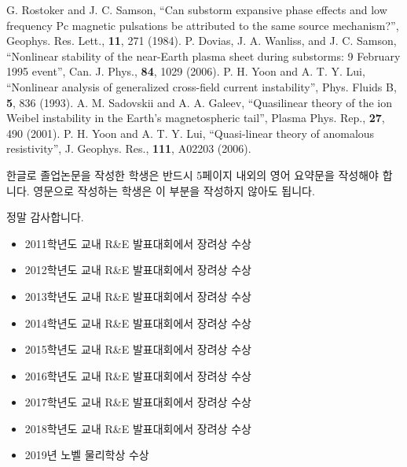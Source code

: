 \documentclass[twoside,11pt]{gshs_thesis}
\begin{document}
\begin{thebibliography}{99}
\begin{onehalfspace}
 G. Rostoker and J. C. Samson, ``Can substorm expansive phase effects and low frequency Pc magnetic pulsations be attributed to the same source mechanism?'', Geophys. Res. Lett., {\bf 11}, 271 (1984).
 P. Dovias, J. A. Wanliss, and J. C. Samson, ``Nonlinear stability of the near-Earth plasma sheet during substorms: 9 February 1995 event'', Can. J. Phys., {\bf 84}, 1029 (2006).
 P. H. Yoon and A. T. Y. Lui, ``Nonlinear analysis of generalized cross-field current instability'', Phys. Fluids B, {\bf 5}, 836 (1993).
 A. M. Sadovskii and A. A. Galeev, ``Quasilinear theory of the ion Weibel instability in the Earth's magnetospheric tail'', Plasma Phys. Rep., {\bf 27}, 490 (2001).
 P. H. Yoon and A. T. Y. Lui, ``Quasi-linear theory of anomalous resistivity'', J. Geophys. Res., {\bf 111}, A02203 (2006).

\end{onehalfspace}\end{thebibliography}

\begin{summary}
한글로 졸업논문을 작성한 학생은 반드시 5페이지 내외의 영어 요약문을 작성해야 합니다. 영문으로 작성하는 학생은 이 부분을 작성하지 않아도 됩니다.
\end{summary}

\begin{acknowledgements}
정말 감사합니다.
\end{acknowledgements}

\begin{researches}
\begin{itemize}
\item{2011학년도 교내 R\&E 발표대회에서 장려상 수상}
\item{2012학년도 교내 R\&E 발표대회에서 장려상 수상}
\item{2013학년도 교내 R\&E 발표대회에서 장려상 수상}
\item{2014학년도 교내 R\&E 발표대회에서 장려상 수상}
\item{2015학년도 교내 R\&E 발표대회에서 장려상 수상}
\item{2016학년도 교내 R\&E 발표대회에서 장려상 수상}
\item{2017학년도 교내 R\&E 발표대회에서 장려상 수상}
\item{2018학년도 교내 R\&E 발표대회에서 장려상 수상}
\item{2019년 노벨 물리학상 수상}
\end{itemize}
\end{researches}
\end{document}
